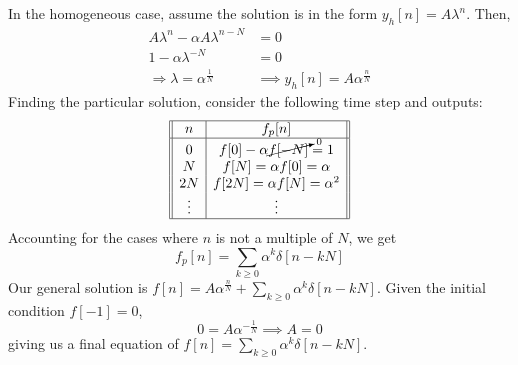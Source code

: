\documentclass{article}
\begin{document}
\subsection{}

In the homogeneous case, assume the solution is in the form \(y_h[n] = A \lambda^n\).
Then,
\begin{align}
    A\lambda^n - \alpha A \lambda^{n - N} &= 0 \\
    1 - \alpha \lambda^{-N} &= 0 \\
    \Rightarrow \lambda = \alpha^{\frac{1}{N}} &\implies y_h[n] = A \alpha^{\frac{n}{N}}
\end{align}
Finding the particular solution, consider the following time step and outputs:
\begin{equation}
    \begin{array}[]{||c|c||}
        \hline
        n & f_p[n] \\
        \hline
        0 & f[0] - \alpha \cancelto{0}{f[-N]} = 1 \\
        N & f[N] = \alpha f[0] = \alpha \\
        2N & f[2N] = \alpha f[N] = \alpha^2 \\
        \vdots & \vdots \\
        \hline
    \end{array}
\end{equation}
Accounting for the cases where \(n\) is not a multiple of \(N\), we get
\begin{equation}
    f_p[n] = \sum_{k \geqslant 0} \alpha^k \delta[n - kN]
\end{equation}
Our general solution is \(f[n] = A \alpha^{\frac{n}{N}} + \sum_{k \geqslant 0} \alpha^k \delta[n - kN]\).
Given the initial condition \(f[-1] = 0\),
\begin{equation}
    0 = A \alpha^{-\frac{1}{N}} \implies A = 0
\end{equation}
giving us a final equation of \(f[n] = \sum_{k \geqslant 0} \alpha^k \delta[n - kN]\).

\subsection{}
\end{document}
